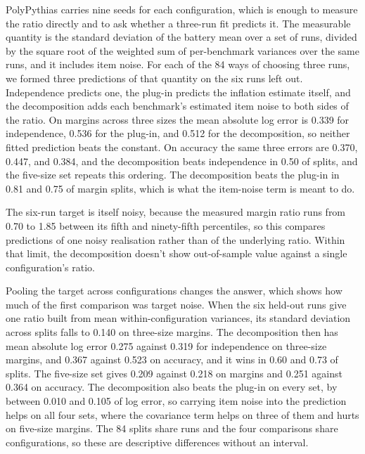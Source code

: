 PolyPythias carries nine seeds for each configuration, which is enough to measure the ratio directly and to ask whether a three-run fit predicts it. The measurable quantity is the standard deviation of the battery mean over a set of runs, divided by the square root of the weighted sum of per-benchmark variances over the same runs, and it includes item noise. For each of the 84 ways of choosing three runs, we formed three predictions of that quantity on the six runs left out. Independence predicts one, the plug-in predicts the inflation estimate itself, and the decomposition adds each benchmark's estimated item noise to both sides of the ratio. On margins across three sizes the mean absolute log error is 0.339 for independence, 0.536 for the plug-in, and 0.512 for the decomposition, so neither fitted prediction beats the constant. On accuracy the same three errors are 0.370, 0.447, and 0.384, and the decomposition beats independence in 0.50 of splits, and the five-size set repeats this ordering. The decomposition beats the plug-in in 0.81 and 0.75 of margin splits, which is what the item-noise term is meant to do.

The six-run target is itself noisy, because the measured margin ratio runs from 0.70 to 1.85 between its fifth and ninety-fifth percentiles, so this compares predictions of one noisy realisation rather than of the underlying ratio. Within that limit, the decomposition doesn't show out-of-sample value against a single configuration's ratio.

Pooling the target across configurations changes the answer, which shows how much of the first comparison was target noise. When the six held-out runs give one ratio built from mean within-configuration variances, its standard deviation across splits falls to 0.140 on three-size margins. The decomposition then has mean absolute log error 0.275 against 0.319 for independence on three-size margins, and 0.367 against 0.523 on accuracy, and it wins in 0.60 and 0.73 of splits. The five-size set gives 0.209 against 0.218 on margins and 0.251 against 0.364 on accuracy. The decomposition also beats the plug-in on every set, by between 0.010 and 0.105 of log error, so carrying item noise into the prediction helps on all four sets, where the covariance term helps on three of them and hurts on five-size margins. The 84 splits share runs and the four comparisons share configurations, so these are descriptive differences without an interval.

